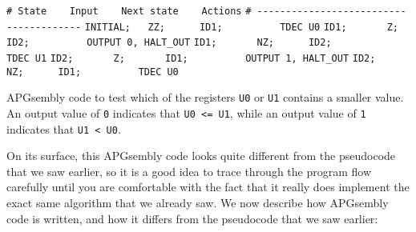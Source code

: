 \begin{apgsembly}
	\begin{algorithmic}\small
		\State \verb|# State    Input    Next state    Actions|
		\State \verb|# ---------------------------------------|
		\State \verb|INITIAL;   ZZ;      ID1;          TDEC U0|
		\State \verb|ID1;       Z;       ID2;          OUTPUT 0, HALT_OUT|
		\State \verb|ID1;       NZ;      ID2;          TDEC U1|
		\State \verb|ID2;       Z;       ID1;          OUTPUT 1, HALT_OUT|
		\State \verb|ID2;       NZ;      ID1;          TDEC U0|
	\end{algorithmic}
	\caption{APGsembly code to test which of the registers \texttt{U0} or \texttt{U1} contains a smaller value. An output value of \texttt{0} indicates that \texttt{U0 <= U1}, while an output value of \texttt{1} indicates that \texttt{U1 < U0}.}\label{alg:apgsembly_test_leq_or_ge}
\end{apgsembly}

On its surface, this APGsembly code looks quite different from the pseudocode that we saw earlier, so it is a good idea to trace through the program flow carefully until you are comfortable with the fact that it really does implement the exact same algorithm that we already saw. We now describe how APGsembly code is written, and how it differs from the pseudocode that we saw earlier:\smallskip

